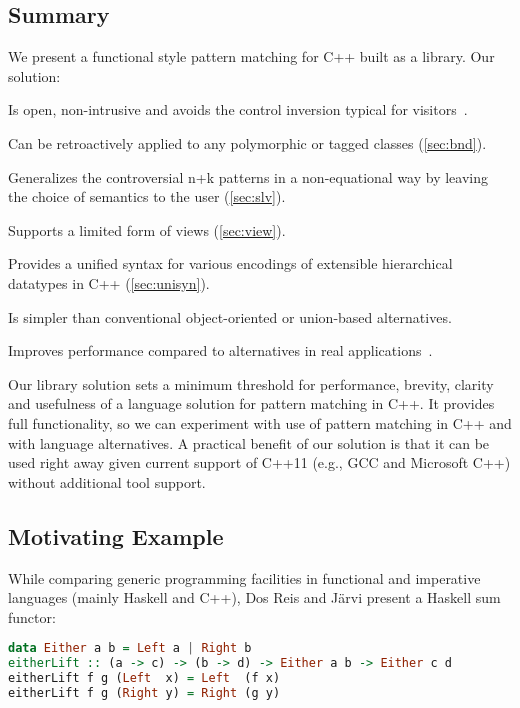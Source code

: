 \documentclass{llncs}
\begin{document}
\subsection{Summary}

We present a functional style pattern matching for C++ built as a library. Our solution:

\begin{compactitem}
\setlength{\itemsep}{0pt}
\setlength{\parskip}{0pt}
  \item Is open, non-intrusive and avoids the control inversion typical for visitors~\cite{TypeSwitch}.
  \item Can be retroactively applied to any polymorphic or tagged classes (\textsection\ref{sec:bnd}).
  \item Generalizes the controversial n+k patterns in a non-equational way by 
        leaving the choice of semantics to the user (\textsection\ref{sec:slv}). 
  \item Supports a limited form of views (\textsection\ref{sec:view}).
  \item Provides a unified syntax for various encodings of extensible 
        hierarchical datatypes in C++ (\textsection\ref{sec:unisyn}).
  \item Is simpler than conventional object-oriented or union-based alternatives.
  \item Improves performance compared to alternatives in real applications~\cite{TypeSwitch}.
\end{compactitem}

\noindent
Our library solution sets a minimum threshold for performance, brevity, clarity 
and usefulness of a language solution for pattern matching in C++. It provides 
full functionality, so we can experiment with use of pattern matching in C++ and 
with language alternatives. A practical benefit of our solution is that it can 
be used right away given current support of C++11 (e.g., GCC and Microsoft C++)  
without additional tool support.

\subsection{Motivating Example}
\label{sec:xmpl}

While comparing generic programming facilities in functional and 
imperative languages (mainly Haskell and C++), Dos Reis and J\"arvi
present a Haskell sum functor\cite{DRJ05}:

\begin{lstlisting}[language=Haskell,keepspaces]
data Either a b = Left a | Right b
eitherLift :: (a -> c) -> (b -> d) -> Either a b -> Either c d
eitherLift f g (Left  x) = Left  (f x)
eitherLift f g (Right y) = Right (g y)
\end{lstlisting}
\end{document}

